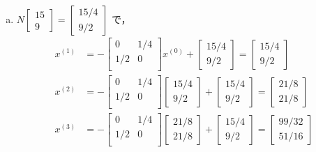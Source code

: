 \documentclass{jsarticle}
\theoremstyle{definition}
\begin{document}
\begin{enumerate}[(a)]
    \item 
    \begin{math}
      N
      \begin{bmatrix}
        15 \\ 9
      \end{bmatrix}
      = 
      \begin{bmatrix}
        15/4 \\ 9/2
      \end{bmatrix}
    \end{math}
    で，
    \begin{align*}
      x^{(1)} &= -
      \begin{bmatrix}
        0 & 1/4 \\
        1/2 & 0 \\
      \end{bmatrix}
      x^{(0)} +
      \begin{bmatrix}
        15/4 \\ 9/2
      \end{bmatrix}
      = 
      \begin{bmatrix}
        15/4 \\ 9/2
      \end{bmatrix}
      \\
      x^{(2)} &= -
      \begin{bmatrix}
        0 & 1/4 \\
        1/2 & 0 \\
      \end{bmatrix}
      \begin{bmatrix}
        15/4 \\ 9/2
      \end{bmatrix}
      +
      \begin{bmatrix}
        15/4 \\ 9/2
      \end{bmatrix}
      = 
      \begin{bmatrix}
        21/8 \\ 21/8
      \end{bmatrix}
      \\
      x^{(3)} &= -
      \begin{bmatrix}
        0 & 1/4 \\
        1/2 & 0 \\
      \end{bmatrix}
      \begin{bmatrix}
        21/8 \\ 21/8
      \end{bmatrix} 
      +
      \begin{bmatrix}
        15/4 \\ 9/2
      \end{bmatrix}
      = 
      \begin{bmatrix}
        99/32 \\ 51/16
      \end{bmatrix}
      \\
    \end{align*}


\end{enumerate}
\end{document}

